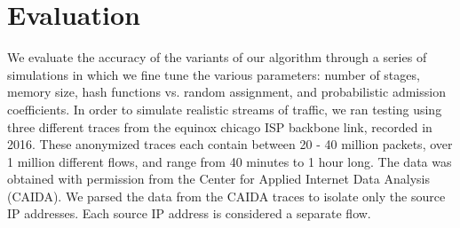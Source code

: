 \section{Evaluation}
\label{sec:eval}
We evaluate the accuracy of the variants of our algorithm through a series of simulations in which we fine tune the various parameters: number of stages, memory size, hash functions vs. random assignment, and probabilistic admission coefficients. In order to simulate realistic streams of traffic, we ran testing using three different traces from the equinox chicago ISP backbone link, recorded in 2016. These anonymized traces each contain between 20 - 40 million packets, over 1 million different flows, and range from 40 minutes to 1 hour long. The data was obtained with permission from the Center for Applied Internet Data Analysis (CAIDA). We parsed the data from the CAIDA traces to isolate only the source IP addresses. Each source IP address is considered a separate flow.
